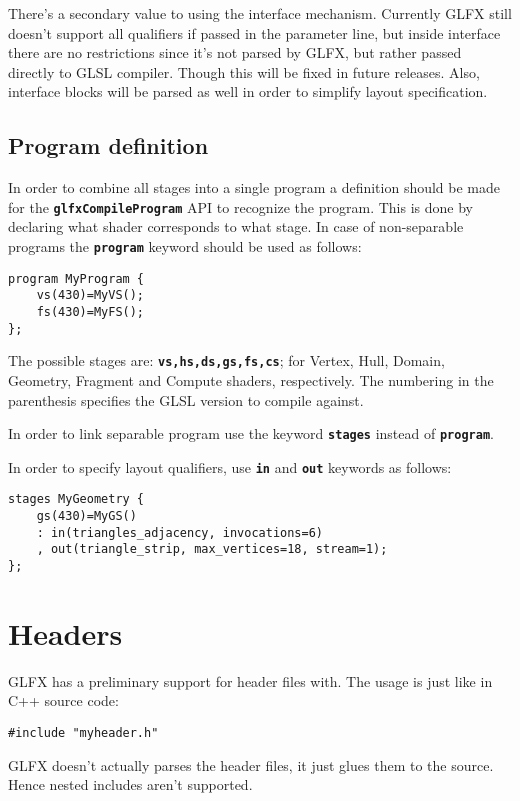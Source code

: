 \documentclass[11pt,a4paper,final,titlepage]{article}
\begin{document}
There's a secondary value to using the interface mechanism. Currently GLFX still doesn't
support all qualifiers if passed in the parameter line, but inside interface there are no restrictions
since it's not parsed by GLFX, but rather passed directly to GLSL compiler. Though this
will be fixed in future releases. Also, interface blocks will be parsed as well in order to
simplify layout specification.

\subsection{Program definition}\label{sec:programs_def}
In order to combine all stages into a single program a definition should be made for the
\texttt{\textbf{glfx\-Compile\-Program}} API to recognize the program. This is done by declaring
what shader corresponds to what stage. In case of non-separable programs
the \texttt{\textbf{program}} keyword should be used as follows:

\begin{lstlisting}
program MyProgram {
	vs(430)=MyVS();
	fs(430)=MyFS();
};
\end{lstlisting}

The possible stages are: \texttt{\textbf{vs,hs,ds,gs,fs,cs}}; for Vertex, Hull, Domain, Geometry, Fragment
and Compute shaders, respectively. The numbering in the parenthesis specifies the GLSL
version to compile against.

In order to link separable program use the keyword \texttt{\textbf{stages}} instead of
\texttt{\textbf{program}}.

In order to specify layout qualifiers, use \texttt{\textbf{in}} and \texttt{\textbf{out}} keywords
as follows:
\begin{lstlisting}
stages MyGeometry {
	gs(430)=MyGS()
	: in(triangles_adjacency, invocations=6)
	, out(triangle_strip, max_vertices=18, stream=1);
};
\end{lstlisting}

\pagebreak
\section{Headers}
GLFX has a preliminary support for header files with. The usage is just like in C++ source
code:
\begin{lstlisting}
#include "myheader.h"
\end{lstlisting}

GLFX doesn't actually parses the header files, it just glues them to the source. Hence nested
includes aren't supported.
\end{document}

